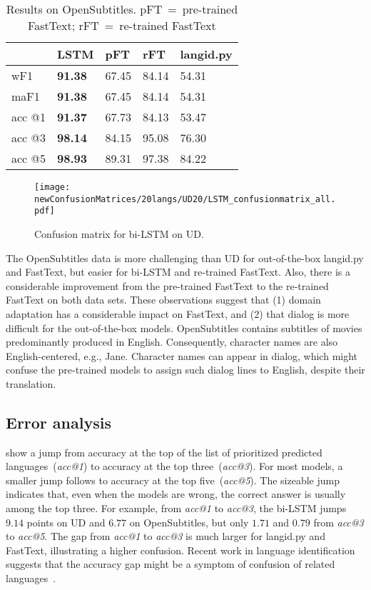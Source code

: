 \documentclass[11pt,a4paper]{article}
\newcommand{\fasttext}{FastText\xspace}
\newcommand{\langidpy}{langid.py\xspace}
\begin{document}
\begin{table}
    \begin{tabular}{|l|l|l|l|l|}
        \hline
        & \textbf{LSTM} & \textbf{pFT} & \textbf{rFT} & \textbf{\langidpy}\\ \hline
        wF1    & \textbf{91.38} & 67.45 & 84.14 & 54.31 \\ \hline
        maF1   & \textbf{91.38} & 67.45 & 84.14 & 54.31 \\ \hline
        acc @1 & \textbf{91.37} & 67.73 & 84.13 & 53.47 \\ \hline
        acc @3 & \textbf{98.14} & 84.15 & 95.08 & 76.30 \\ \hline
        acc @5 & \textbf{98.93} & 89.31 & 97.38 & 84.22 \\ \hline
    \end{tabular}
    \caption{Results on OpenSubtitles. pFT~=~pre-trained \fasttext; rFT~=~re-trained \fasttext}
    \label{tab:os20}
\end{table}


\begin{figure*}
    \centering
    \texttt{[image: newConfusionMatrices/20langs/UD20/LSTM\_confusionmatrix\_all.pdf]}
    \caption{Confusion matrix for bi-LSTM on UD.}
    \label{fig:conf_ud20_bilstm}
\end{figure*}

The OpenSubtitles data is more challenging than UD for out-of-the-box \langidpy and \fasttext, but easier for bi-LSTM and re-trained \fasttext. Also, there is a considerable improvement from the pre-trained \fasttext to the re-trained \fasttext on both data sets. These observations suggest that (1) domain adaptation has a considerable impact on \fasttext, and (2) that dialog is more difficult for the out-of-the-box models. OpenSubtitles contains subtitles of movies predominantly produced in English. Consequently, character names are also English-centered, e.g., Jane. Character names can appear in dialog, which might confuse the pre-trained models to assign such dialog lines to English, despite their translation.



\subsection{Error analysis}

 show a jump from accuracy at the top of the list of prioritized predicted languages~(\emph{acc@1}) to accuracy at the top three~(\emph{acc@3}). For most models, a smaller jump follows to accuracy at the top five~(\emph{acc@5}). The sizeable jump indicates that, even when the models are wrong, the correct answer is usually among the top three. For example, from \emph{acc@1} to \emph{acc@3}, the bi-LSTM jumps $9.14$ points on UD and $6.77$ on OpenSubtitles, but only $1.71$ and $0.79$ from \emph{acc@3} to \emph{acc@5}. The gap from \emph{acc@1} to \emph{acc@3} is much larger for \langidpy and \fasttext, illustrating a higher confusion. Recent work in language identification suggests that the accuracy gap might be a symptom of confusion of related languages~\cite{haas2020discriminating}.
\end{document}
